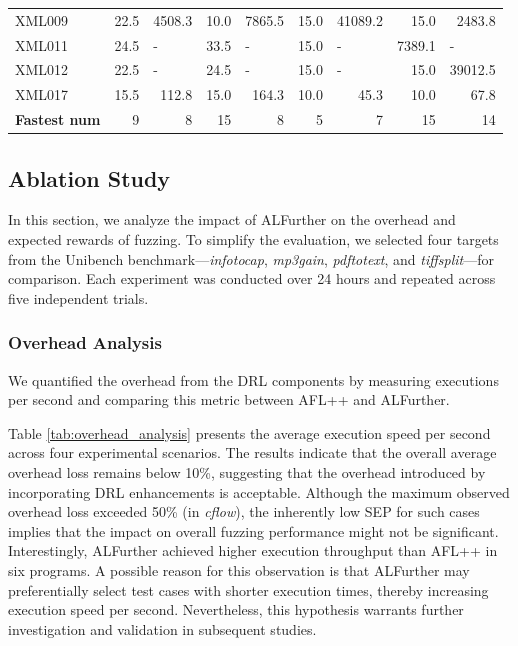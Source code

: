 \documentclass[lettersize,journal]{IEEEtran}
\begin{document}
\begin{table}[t!]
{\begin{tabular}{lrrrrrrrr}
			XML009 & 22.5  & 4508.3  & 10.0  & 7865.5  & 15.0  & 41089.2  & 15.0  & 2483.8  \\
			XML011 & 24.5  & \multicolumn{1}{l}{-} & 33.5  & \multicolumn{1}{l}{-} & 15.0  & \multicolumn{1}{l}{-} & 7389.1  & \multicolumn{1}{l}{-} \\
			XML012 & 22.5  & \multicolumn{1}{l}{-} & 24.5  & \multicolumn{1}{l}{-} & 15.0  & \multicolumn{1}{l}{-} & 15.0  & 39012.5  \\
			XML017 & 15.5  & 112.8  & 15.0  & 164.3  & 10.0  & 45.3  & 10.0  & 67.8  \\
			\midrule
			\textbf{Fastest num} & 9     & 8     & 15    & 8     & 5     & 7     & 15    & 14  \\
			\bottomrule
		\end{tabular}%
	}
	\label{tab:bug_time}%
\end{table}%



\subsection{Ablation Study}
In this section, we analyze the impact of ALFurther on the overhead and expected rewards of fuzzing. To simplify the evaluation, we selected four targets from the Unibench benchmark—\textit{infotocap}, \textit{mp3gain}, \textit{pdftotext}, and \textit{tiffsplit}—for comparison. Each experiment was conducted over 24 hours and repeated across five independent trials.

\subsubsection{Overhead Analysis}

We quantified the overhead from the DRL components by measuring executions per second and comparing this metric between AFL++ and ALFurther.

Table \ref{tab:overhead_analysis} presents the average execution speed per second across four experimental scenarios. The results indicate that the overall average overhead loss remains below 10\%, suggesting that the overhead introduced by incorporating DRL enhancements is acceptable. Although the maximum observed overhead loss exceeded 50\% (in \textit{cflow}), the inherently low SEP for such cases implies that the impact on overall fuzzing performance might not be significant. Interestingly, ALFurther achieved higher execution throughput than AFL++ in six programs. A possible reason for this observation is that ALFurther may preferentially select test cases with shorter execution times, thereby increasing execution speed per second. Nevertheless, this hypothesis warrants further investigation and validation in subsequent studies.
\end{document}
